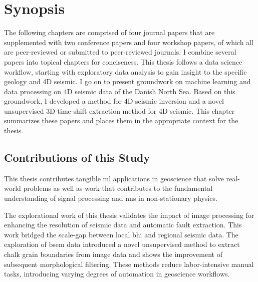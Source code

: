 \chapter{Synopsis}
\label{sec:synopsis}
The following chapters are comprised of four journal papers that are supplemented with two conference papers and four workshop papers, of which all are peer-reviewed or submitted to peer-reviewed journals. I combine several papers into topical chapters for conciseness. This thesis follows a data science workflow, starting with exploratory data analysis to gain insight to the specific geology and 4D seismic. I go on to present groundwork on machine learning and data processing on 4D seismic data of the Danish North Sea. Based on this groundwork, I developed a method for 4D seismic inversion and a novel unsupervised 3D time-shift extraction method for 4D seismic. This chapter summarizes these papers and places them in the appropriate context for the thesis.









\section{Contributions of this Study}

This thesis contributes tangible \acl{ml} applications in geoscience that solve real-world problems as well as work that contributes to the fundamental understanding of signal processing and \aclp{nn} in non-stationary physics.

The explorational work of this thesis validates the impact of image processing for enhancing the resolution of seismic data and automatic fault extraction. This work bridged the scale-gap between local \acl{bhi} and regional seismic data. The exploration of \acl{bsem} data introduced a novel unsupervised method to extract chalk grain boundaries from image data and shows the improvement of subsequent morphological filtering. These methods reduce labor-intensive manual tasks, introducing varying degrees of automation in geoscience workflows.

